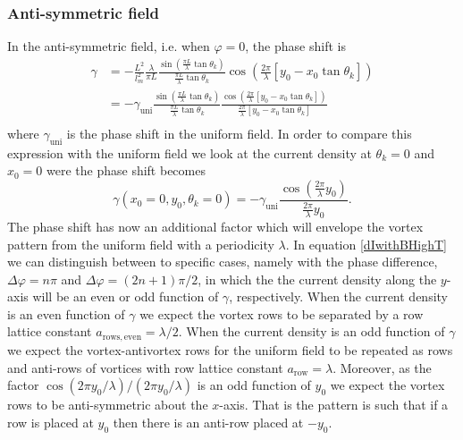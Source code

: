 \subsubsection{Anti-symmetric field}
In the anti-symmetric field, i.e. when $\varphi = 0$, the phase shift is
\begin{equation}
\begin{split}
    \gamma &= -\frac{L^2}{l_m^2}\frac{\lambda}{\pi L }\frac{\sin\left(\frac{\pi L}{\lambda}\tan\theta_k\right)}{\frac{\pi L}{\lambda}\tan\theta_k}\cos\left(\frac{2\pi}{\lambda}\left[y_0-x_0\tan\theta_k\right]\right)\\
    &=-\gamma_{\mathrm{uni}}\frac{\sin\left(\frac{\pi L}{\lambda}\tan\theta_k\right)}{\frac{\pi L}{\lambda}\tan\theta_k}\frac{\cos\left(\frac{2\pi}{\lambda}\left[y_0-x_0\tan\theta_k\right]\right)}{\frac{2\pi}{\lambda}\left[y_0-x_0\tan\theta_k\right]}\\
\end{split}
\end{equation}
where $\gamma_{\mathrm{uni}}$ is the phase shift in the uniform field. In order to compare this expression with the uniform field we look at the current density at $\theta_k = 0$ and $x_0 = 0$ were the phase shift becomes
\begin{equation}
    \gamma(x_0=0, y_0, \theta_k = 0) = -\gamma_{\mathrm{uni}} \frac{\cos\left(\frac{2\pi}{\lambda}y_0\right)}{\frac{2\pi}{\lambda}y_0}.
\end{equation}
The phase shift has now an additional factor which will envelope the vortex pattern from the uniform field with a periodicity $\lambda$. In equation \eqref{dIwithBHighT} we can distinguish between to specific cases, namely with the phase difference, $\Delta \varphi = n\pi$ and $\Delta \varphi = (2n+1)\pi/2$, in which the the current density along the $y$-axis will be an even or odd function of $\gamma$, respectively. When the current density is an even function of $\gamma$ we expect the vortex rows to be separated by a row lattice constant $a_{\mathrm{rows,even}} = \lambda/2$. When the current density is an odd function of $\gamma$ we expect the vortex-antivortex rows for the uniform field to be repeated as rows and anti-rows of vortices with row lattice constant $a_{\mathrm{row}} = \lambda$. Moreover, as the factor $\cos(2\pi y_0/\lambda)/(2\pi y_0/\lambda)$ is an odd function of $y_0$ we expect the vortex rows to be anti-symmetric about the $x$-axis. That is the pattern is such that if a row is placed at $y_0$ then there is an anti-row placed at $-y_0$. 
\\
